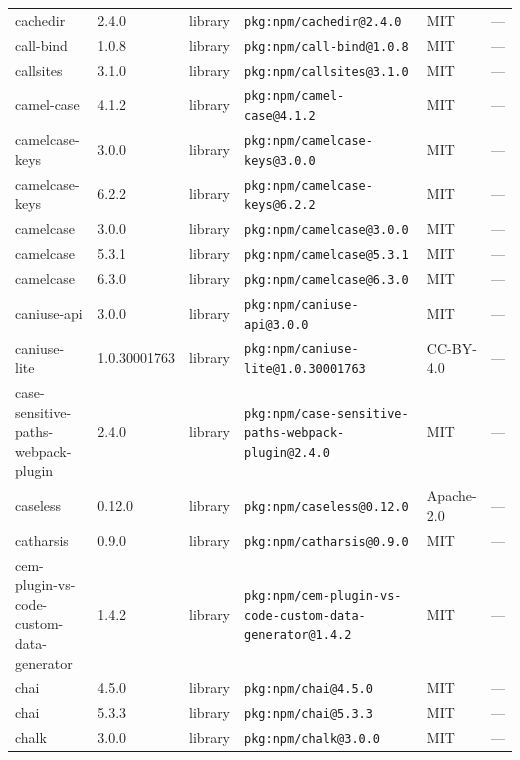 \documentclass[11pt,a4paper]{article}
\begin{document}
\begin{longtable}{|p{4cm}|p{2cm}|p{1.6cm}|p{5cm}|p{1.5cm}|p{3.5cm}|}
\raggedright cachedir & 2.4.0 & library & \small\texttt{pkg:npm/cachedir@2.4.0} & MIT & \small — \\
\raggedright call-bind & 1.0.8 & library & \small\texttt{pkg:npm/call-bind@1.0.8} & MIT & \small — \\
\raggedright callsites & 3.1.0 & library & \small\texttt{pkg:npm/callsites@3.1.0} & MIT & \small — \\
\raggedright camel-case & 4.1.2 & library & \small\texttt{pkg:npm/camel-case@4.1.2} & MIT & \small — \\
\raggedright camelcase-keys & 3.0.0 & library & \small\texttt{pkg:npm/camelcase-keys@3.0.0} & MIT & \small — \\
\raggedright camelcase-keys & 6.2.2 & library & \small\texttt{pkg:npm/camelcase-keys@6.2.2} & MIT & \small — \\
\raggedright camelcase & 3.0.0 & library & \small\texttt{pkg:npm/camelcase@3.0.0} & MIT & \small — \\
\raggedright camelcase & 5.3.1 & library & \small\texttt{pkg:npm/camelcase@5.3.1} & MIT & \small — \\
\raggedright camelcase & 6.3.0 & library & \small\texttt{pkg:npm/camelcase@6.3.0} & MIT & \small — \\
\raggedright caniuse-api & 3.0.0 & library & \small\texttt{pkg:npm/caniuse-api@3.0.0} & MIT & \small — \\
\raggedright caniuse-lite & 1.0.30001763 & library & \small\texttt{pkg:npm/caniuse-lite@1.0.30001763} & CC-BY-4.0 & \small — \\
\raggedright case-sensitive-paths-webpack-plugin & 2.4.0 & library & \small\texttt{pkg:npm/case-sensitive-paths-webpack-plugin@2.4.0} & MIT & \small — \\
\raggedright caseless & 0.12.0 & library & \small\texttt{pkg:npm/caseless@0.12.0} & Apache-2.0 & \small — \\
\raggedright catharsis & 0.9.0 & library & \small\texttt{pkg:npm/catharsis@0.9.0} & MIT & \small — \\
\raggedright cem-plugin-vs-code-custom-data-generator & 1.4.2 & library & \small\texttt{pkg:npm/cem-plugin-vs-code-custom-data-generator@1.4.2} & MIT & \small — \\
\raggedright chai & 4.5.0 & library & \small\texttt{pkg:npm/chai@4.5.0} & MIT & \small — \\
\raggedright chai & 5.3.3 & library & \small\texttt{pkg:npm/chai@5.3.3} & MIT & \small — \\
\raggedright chalk & 3.0.0 & library & \small\texttt{pkg:npm/chalk@3.0.0} & MIT & \small — \\

\end{longtable}
\end{document}
